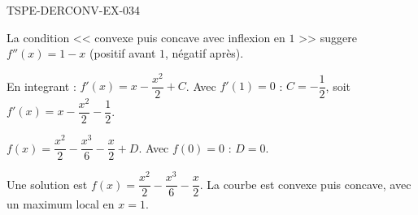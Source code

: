 \begin{corrige}{TSPE-DERCONV-EX-034}

La condition << convexe puis concave avec inflexion en $1$ >> suggere $f''(x) = 1 - x$ (positif avant $1$, négatif après).


En integrant : $f'(x) = x - \dfrac{x^2}{2} + C$. Avec $f'(1)=0$ : $C = -\dfrac{1}{2}$, soit $f'(x) = x - \dfrac{x^2}{2} - \dfrac{1}{2}$.

$f(x) = \dfrac{x^2}{2} - \dfrac{x^3}{6} - \dfrac{x}{2} + D$. Avec $f(0)=0$ : $D=0$.

Une solution est $\boxed{f(x) = \dfrac{x^2}{2} - \dfrac{x^3}{6} - \dfrac{x}{2}}$. La courbe est convexe puis concave, avec un maximum local en $x=1$.

\end{corrige}
